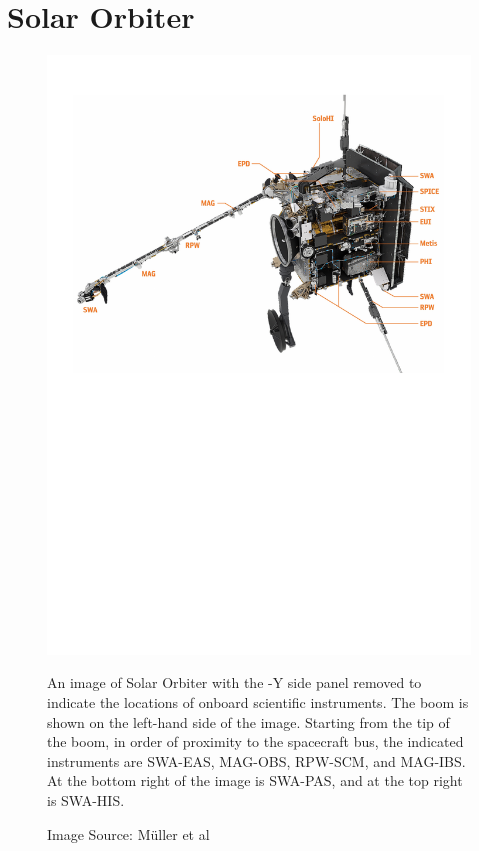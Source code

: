 \section{Solar Orbiter}
\begin{figure}[h!]
    \centering
    \includegraphics[width=1\linewidth]{figures/instruments.pdf}
    \caption{An image of Solar Orbiter with the -Y side panel removed to indicate the locations of onboard scientific instruments\cite{muller2020}. The boom is shown on the left-hand side of the image. Starting from the tip of the boom, in order of proximity to the spacecraft bus, the indicated instruments are SWA-EAS, MAG-OBS, RPW-SCM, and MAG-IBS\cite{horbury2020}\cite{maksimovic2020}. At the bottom right of the image is SWA-PAS, and at the top right is SWA-HIS\cite{owen2020}. }
    \caption*{Image Source: Müller et al\cite{muller2020}}
    \label{fig: instruments}
\end{figure}
\\

